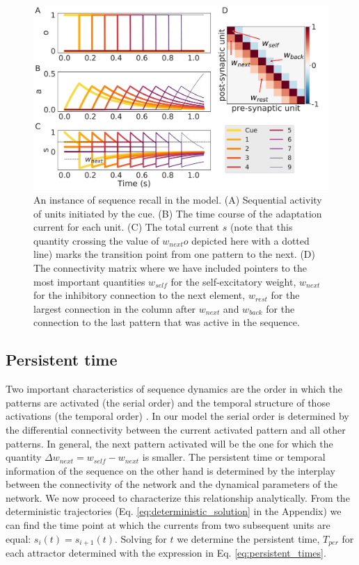 \documentclass[10pt,a4paper]{article}
\begin{document}
\begin{figure}[H]
\centering
\includegraphics[scale=0.25]{simple_bcpnn_recall.pdf}
\caption{An instance of sequence recall in the model. (A) Sequential activity of units initiated by the cue. (B) The time course of the adaptation current for each unit. (C) The total current $s$ (note that this quantity crossing the value of $w_{next} o$ depicted here with a dotted line) marks the transition point from one pattern to the next. (D) The connectivity matrix where we have included pointers to the most important quantities $w_{self}$ for the self-excitatory weight, $w_{next}$ for the inhibitory connection to the next element, $w_{rest}$ for the largest connection in the column after $w_{next}$ and $w_{back}$ for the connection to the last pattern that was active in the sequence.}
\label{fig:recall}
\end{figure}

\subsection{Persistent time}

Two important characteristics of sequence dynamics are the order in which the patterns are activated (the serial order) and the temporal structure of those activations (the temporal order) \cite{dominey2000neural}. 
In our model the serial order is determined by the differential connectivity between the current activated pattern and all other patterns. In general, the next pattern activated will be the one for which the quantity $\Delta w_{next}  = w_{self} - w_{next}$ is smaller. The persistent time or temporal information of the sequence on the other hand is determined by the interplay between the connectivity of the network and the dynamical parameters of the network. We now proceed to characterize  this relationship analytically. From the deterministic trajectories (Eq. \ref{eq:deterministic_solution} in the Appendix) we can find the time point at which the currents from two subsequent units are equal: $s_i(t) = s_{i + 1}(t)$. Solving for $\textit{t}$ we determine the persistent time, $T_{per}$ for each attractor determined with the expression in Eq. \ref{eq:persistent_times}.  
\end{document}
